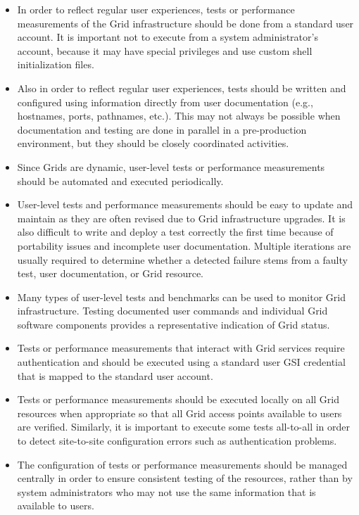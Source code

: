\documentclass[times,10pt,twocolumn]{article}
\begin{document}
\begin{itemize}

\item In order to reflect regular user experiences, tests or performance
measurements of the Grid infrastructure should be done from a standard user
account.  It is important not to execute from a system administrator's account,
because it may have special privileges and use custom shell initialization files.

\item Also in order to reflect regular user experiences, tests should be
written and configured using information directly from user documentation
(e.g., hostnames, ports, pathnames, etc.).  This may not always be possible
when documentation and testing are done in parallel in a pre-production
environment, but they should be closely coordinated activities. 

\item Since Grids are dynamic, user-level tests or performance measurements
should be automated and executed periodically.

\item User-level tests and performance measurements should be easy to update
and maintain as they are often revised due to Grid infrastructure upgrades.
It is also difficult to write and deploy a test correctly the first time
because of portability issues and incomplete user documentation.  Multiple
iterations are usually required to determine whether a detected failure stems
from a faulty test, user documentation, or Grid resource.  

\item Many types of user-level tests and benchmarks can be used to monitor 
Grid infrastructure.  Testing documented user commands and individual Grid
software components provides a representative indication of Grid status.  

\item Tests or performance measurements that interact with Grid services
require authentication and should be executed using a standard user GSI
credential that is mapped to the standard user account.  

\item Tests or performance measurements should be executed locally on all Grid
resources when appropriate so that all Grid access points available to users
are verified.  Similarly, it is important to execute some tests all-to-all
in order to detect site-to-site configuration errors such as authentication
problems.

\item The configuration of tests or performance measurements should be managed
centrally in order to ensure consistent testing of the resources, rather than
by system administrators who may not use the same information that is
available to users.

\end{itemize}
\end{document}

